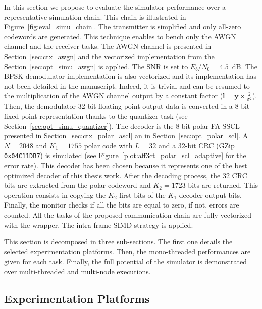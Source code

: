In this section we propose to evaluate the simulator performance over a
representative simulation chain. This chain is illustrated in
Figure~\ref{fig:eval_simu_chain}. The transmitter is simplified and only
all-zero codewords are generated. This technique enables to bench only the AWGN
channel and the receiver tasks. The AWGN channel is presented in
Section~\ref{sec:ctx_awgn} and the vectorized implementation from the
Section~\ref{sec:opt_simu_awgn} is applied. The SNR is set to
$E_b/N_0 = 4.5$~dB. The BPSK demodulator implementation is also vectorized and
its implementation has not been detailed in the manuscript. Indeed, it is
trivial and can be resumed to the multiplication of the AWGN channel output by a
constant factor ($\bm{l} = \bm{y} \times \frac{2}{\sigma^2}$). Then, the
demodulator 32-bit floating-point output data is converted in a 8-bit
fixed-point representation thanks to the quantizer task (see
Section~\ref{sec:opt_simu_quantizer}). The decoder is the 8-bit polar FA-SSCL
presented in Section~\ref{sec:ctx_polar_ascl} an in
Section~\ref{sec:opt_polar_scl}. A $N = 2048$ and $K_1 = 1755$ polar code with
$L = 32$ and a 32-bit CRC (GZip \verb|0x04C11DB7|) is simulated (see
Figure~\ref{plot:aff3ct_polar_scl_adaptive} for the error rate). This decoder
has been chosen because it represents one of the best optimized decoder of this
thesis work. After the decoding process, the 32 CRC bits are extracted from the
polar codeword and $K_2 = 1723$ bits are returned. This operation consists in
copying the $K_2$ first bits of the $K_1$ decoder output bits. Finally, the
monitor checks if all the bits are equal to zero, if not, errors are counted.
All the tasks of the proposed communication chain are fully vectorized with the
\MIPP wrapper. The intra-frame SIMD strategy is applied.

This section is decomposed in three sub-sections. The first one details the
selected experimentation platforms. Then, the mono-threaded performances
are given for each task. Finally, the full potential of the simulator is
demonstrated over multi-threaded and multi-node executions.

\subsection{Experimentation Platforms}


